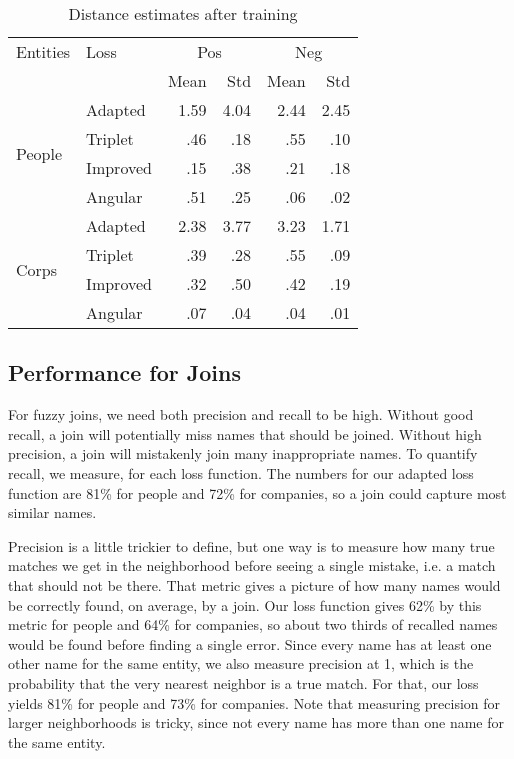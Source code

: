 \begin{table}[ht]
\caption{Distance estimates after training}
\label{Evaluation}
\begin{center}
\begin{tabular}{|l|l|r|r|r|r|}
\hline
Entities & Loss & \multicolumn{2}{|c|}{Pos} & \multicolumn{2}{|c|}{Neg} \\
& & Mean & Std & Mean & Std \\
\hline
\multirow{4}{*}{People} & Adapted & 1.59 & 4.04 & 2.44 & 2.45 \\
\cline{2-6}
& Triplet & .46 & .18 & .55 & .10 \\
\cline{2-6}
& Improved & .15 & .38 & .21 & .18 \\
\cline{2-6}
& Angular & .51 & .25 & .06 & .02 \\
\hline
\multirow{4}{*}{Corps} & Adapted & 2.38 & 3.77 & 3.23 & 1.71 \\
\cline{2-6}
& Triplet & .39 & .28 & .55 & .09 \\
\cline{2-6}
& Improved & .32 & .50 & .42 & .19 \\
\cline{2-6}
& Angular & .07 & .04 & .04 & .01 \\
\hline
\end{tabular}%
\end{center}
\end{table}


\subsection{Performance for Joins}

 For fuzzy joins, we need both precision and recall to be high.  Without good recall, a join will potentially miss names that should be joined.  Without high precision, a join will mistakenly join many inappropriate names.  To quantify recall, we measure, for each loss function.  The numbers for our adapted loss function are 81\% for people and 72\% for companies, so a join could capture most similar names.

 Precision is a little trickier to define, but one way is to measure how many true matches we get in the neighborhood before seeing a single mistake, i.e. a match that should not be there.  That metric gives a picture of how many names would be correctly found, on average, by a join.  Our loss function gives 62\% by this metric for people and 64\% for companies, so about two thirds of recalled names would be found before finding a single error.  Since every name has at least one other name for the same entity, we also measure precision at 1, which is the probability that the very nearest neighbor is a true match.  For that, our loss yields 81\% for people and 73\% for companies.  Note that measuring precision for larger neighborhoods is tricky, since not every name has more than one name for the same entity.

